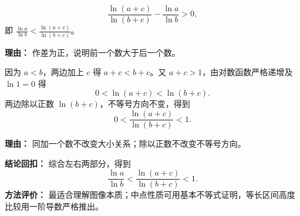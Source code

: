 \begin{proofbox}
\begin{description}[style=nextline, leftmargin=2.8em, labelsep=0.5em, itemsep=0.55em]
\[\frac{\ln(a+c)}{\ln(b+c)}-\frac{\ln a}{\ln b}>0,\]
即 $\frac{\ln a}{\ln b}<\frac{\ln(a+c)}{\ln(b+c)}$。\par\textbf{理由：} 作差为正，说明前一个数大于后一个数。
\item[\textbf{步骤7（证明右侧小于1）：}] 因为 $a<b$，两边加上 $c$ 得 $a+c<b+c$。又 $a+c>1$，由对数函数严格递增及 $\ln1=0$ 得
\[0<\ln(a+c)<\ln(b+c).\]
两边除以正数 $\ln(b+c)$，不等号方向不变，得到
\[0<\frac{\ln(a+c)}{\ln(b+c)}<1.\]
\par\textbf{理由：} 同加一个数不改变大小关系；除以正数不改变不等号方向。
\end{description}
\medskip
\textbf{结论回扣：} 综合左右两部分，得到
\[
\boxed{\frac{\ln a}{\ln b}<\frac{\ln(a+c)}{\ln(b+c)}<1}.
\]
\textbf{方法评价：} 最适合理解图像本质；中点性质可用基本不等式证明，等长区间高度比较用一阶导数严格推出。\end{proofbox}

